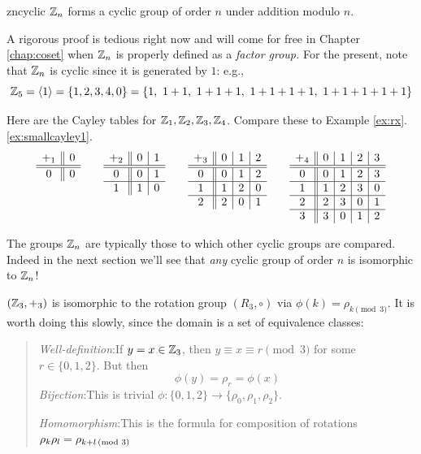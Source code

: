 \begin{thm}{}{zncyclic}
	$\mathbb{Z}_n$ forms a cyclic group of order $n$ under addition modulo $n$.
\end{thm}

A rigorous proof is tedious right now and will come for free in Chapter \ref{chap:coset} when $\mathbb{Z}_n$ is properly defined as a \emph{factor group.} For the present, note that $\mathbb{Z}_n$ is cyclic since it is generated by $1$: e.g.,
\[
	\Z_5=\ip 1=\{1,2,3,4,0\}=\{1,\ 1+1,\ 1+1+1,\ 1+1+1+1,\ 1+1+1+1+1\}
\]

\begin{examples}{}{}
	Here are the Cayley tables for $\mathbb{Z}_1,\mathbb{Z}_2,\mathbb{Z}_3,\mathbb{Z}_4$. Compare these to Example \ref*{ex:rx}.\ref{ex:smallcayley1}.
	\[
		\begin{array}[t]{c||c}
			+_1 & 0\\\hline\hline
			0 & 0
		\end{array}
		\qquad
		\begin{array}[t]{c||c|c}
			+_2 & 0 & 1\\\hline\hline
			0 & 0 & 1\\\hline
			1 & 1 & 0
		\end{array}
		\qquad
		\begin{array}[t]{c||c|c|c}
			+_3 & 0 & 1 & 2\\\hline\hline
			0 & 0 & 1 & 2\\\hline
			1 & 1 & 2 & 0\\\hline
			2 & 2 & 0 & 1
		\end{array}
		\qquad
		\begin{array}[t]{c||c|c|c|c}
			+_4 & 0 & 1 & 2 & 3\\\hline\hline
			0 & 0 & 1 & 2 & 3\\\hline
			1 & 1 & 2 & 3 & 0\\\hline
			2 & 2 & 3 & 0 & 1\\\hline
			3 & 3 & 0 & 1 & 2
		\end{array}
	\]
\end{examples}

The groups $\mathbb{Z}_n$ are typically those to which other cyclic groups are compared. Indeed in the next section we'll see that \emph{any} cyclic group of order $n$ is isomorphic to $\mathbb{Z}_n$!

\begin{example}{}{}
	$(\mathbb{Z}_3,+_3)$ is isomorphic to the rotation group $(R_3,\circ)$ via $\phi(k)=\rho_{k\pmod 3}$.
	\smallbreak
	It is worth doing this slowly, since the domain is a set of equivalence classes:
	\begin{quote}
		\emph{Well-definition}:\lstsp If $y=x\in\mathbb{Z}_3$, then $y\equiv x\equiv r\pmod 3$ for some $r\in\{0,1,2\}$. But then
		\[
			\phi(y)=\rho_r=\phi(x)
		\]
		\emph{Bijection}:\lstsp This is trivial $\phi:\{0,1,2\}\to\{\rho_0,\rho_1,\rho_2\}$.\par
		\emph{Homomorphism}:\lstsp This is the formula for composition of rotations
		$\rho_k\rho_l=\rho_{k+l\negthickspace\pmod 3}$
	\end{quote}
\end{example}



